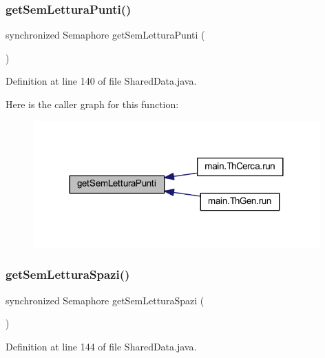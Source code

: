 \subsubsection{\texorpdfstring{get\+Sem\+Lettura\+Punti()}{getSemLetturaPunti()}}
{\footnotesize\ttfamily synchronized Semaphore get\+Sem\+Lettura\+Punti (\begin{DoxyParamCaption}{ }\end{DoxyParamCaption})}



Definition at line 140 of file Shared\+Data.\+java.

Here is the caller graph for this function\+:
\nopagebreak
\begin{figure}[H]
\begin{center}
\leavevmode
\includegraphics[width=312pt]{classmain_1_1_shared_data_a3635e525daf3f0e52187d20e37c90f68_icgraph}
\end{center}
\end{figure}
\mbox{\label{classmain_1_1_shared_data_a218db8263ccc5317ba83f2e4ad2d49c8}} 
\subsubsection{\texorpdfstring{get\+Sem\+Lettura\+Spazi()}{getSemLetturaSpazi()}}
{\footnotesize\ttfamily synchronized Semaphore get\+Sem\+Lettura\+Spazi (\begin{DoxyParamCaption}{ }\end{DoxyParamCaption})}



Definition at line 144 of file Shared\+Data.\+java.

